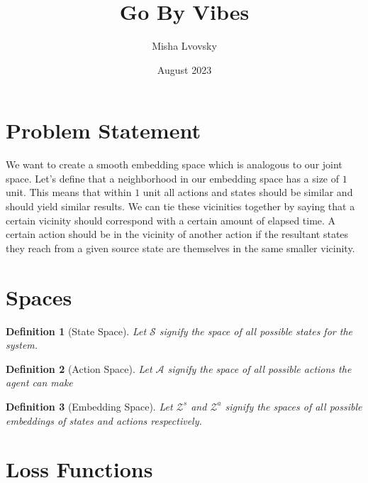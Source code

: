 \documentclass{article}
\title{Go By Vibes}
\author{Misha Lvovsky}
\date{August 2023}
\newtheorem{definition}{Definition}
\begin{document}
\maketitle

\section{Problem Statement}

We want to create a smooth embedding space which is analogous to our joint space.
Let's define that a neighborhood in our embedding space has a size of $1$ unit. This means that within $1$ unit all actions and states should be similar and should yield similar results. We can tie these vicinities together by saying that a certain vicinity should correspond with a certain amount of elapsed time. A certain action should be in the vicinity of another action if the resultant states they reach from a given source state are themselves in the same smaller vicinity.

\section{Spaces}

\begin{definition} [State Space] Let $\mathcal{S}$ signify the space of all possible states for the system.
\end{definition}
\begin{definition} [Action Space]
    Let $\mathcal{A}$ signify the space of all possible actions the agent can make
\end{definition}
\begin{definition} [Embedding Space]
Let $\mathcal{Z}^s$ and $\mathcal{Z}^a$ signify the spaces of all possible embeddings of states and actions respectively.
\end{definition}

\section{Loss Functions}
\end{document}
